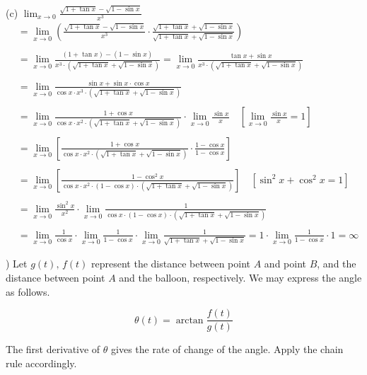 \documentclass{article}
\begin{document}
\noindent (c) $\displaystyle\lim_{x\to0}\frac{\sqrt{1+\tan x}-\sqrt{1-\sin x}}{x^3}$
\begin{align*}
&=\lim_{x\to0}\left(\frac{\sqrt{1+\tan x}-\sqrt{1-\sin x}}{x^3}\cdot\frac{\sqrt{1+\tan x}+\sqrt{1-\sin x}}{\sqrt{1+\tan x}+\sqrt{1-\sin x}}\right)\\\\&=\lim_{x\to0}\frac{(1+\tan x)-(1-\sin x)}{x^3\cdot\left(\sqrt{1+\tan x}+\sqrt{1-\sin x}\right)}=\lim_{x\to0}\frac{\tan x+\sin x}{x^3\cdot\left(\sqrt{1+\tan x}+\sqrt{1-\sin x}\right)}\\\\&=\lim_{x\to0}\frac{\sin x+\sin x\cdot\cos x}{\cos x\cdot x^3\cdot\left(\sqrt{1+\tan x}+\sqrt{1-\sin x}\right)}\\\\&=\lim_{x\to0}\frac{1+\cos x}{\cos x\cdot x^2\cdot\left(\sqrt{1+\tan x}+\sqrt{1-\sin x}\right)}\cdot\lim_{x\to0}\frac{\sin x}{x}\quad\left[\lim_{x\to0}\frac{\sin x}x=1\right]\\\\&=\lim_{x\to0}\left[\frac{1+\cos x}{\cos x\cdot x^2\cdot\left(\sqrt{1+\tan x}+\sqrt{1-\sin x}\right)}\cdot\frac{1-\cos x}{1-\cos x}\right]\\\\&=\lim_{x\to0}\left[\frac{1-\cos^2x}{\cos x\cdot x^2\cdot(1-\cos x)\cdot\left(\sqrt{1+\tan x}+\sqrt{1-\sin x}\right)}\right]\quad\left[\sin^2x+\cos^2x=1\right]\\\\&=\lim_{x\to0}\frac{\sin^2x}{x^2}\cdot\lim_{x\to0}\frac1{\cos x\cdot(1-\cos x)\cdot\left(\sqrt{1+\tan x}+\sqrt{1-\sin x}\right)}\\\\&=\lim_{x\to0}\frac1{\cos x}\cdot\lim_{x\to0}\frac1{1-\cos x}\cdot\lim_{x\to0}\frac1{\sqrt{1+\tan x}+\sqrt{1-\sin x}}=1\cdot\lim_{x\to0}\frac1{1-\cos x}\cdot1 =\boxed{\infty}\end{align*}

\hfill

) Let $g(t),\,f(t)$ represent the distance between point $A$ and point $B$, and the distance between point $A$ and the balloon, respectively. We may express the angle as follows.

\begin{equation*}\theta(t)=\arctan{\frac{f(t)}{g(t)}}\end{equation*}

\hfill

\noindent The first derivative of $\theta$ gives the rate of change of the angle. Apply the chain rule accordingly.
\end{document}
